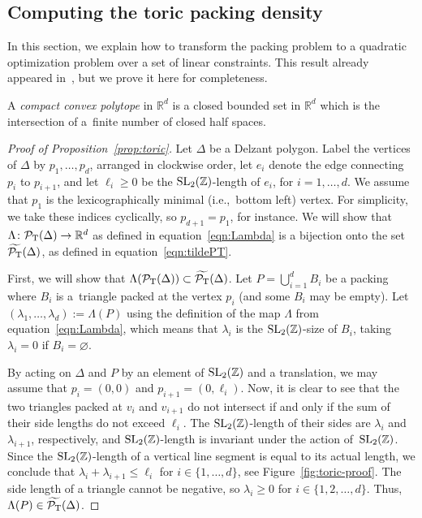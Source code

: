 \documentclass[10pt,a4paper]{amsart}
\numberwithin{equation}{section}
\def\R{{\mathbb R}}
\def\Z{{\mathbb Z}}
\newcommand{\De}{\Delta}
\newcommand{\PT}{\mathcal{P}_{\rm T}}
\newcommand{\PTtilde}{\widetilde{\PT}}
\newcommand{\SL}{{\rm SL}_2(\Z)}
\theoremstyle{definition}
\theoremstyle{plain}
\theoremstyle{plain}
\begin{document}
\subsection{Computing the toric packing density}
\label{sec:toric-computing}

In this section, we explain how to transform the packing problem to a quadratic optimization problem over a set of linear constraints.
This result already appeared in~\cite[Proposition 1.4]{PeSc2008}, but we prove it here for completeness.

A \emph{compact convex polytope} in $\R^d$ is a closed bounded set in $\R^d$ which is the intersection of a~finite number of closed half spaces.





\begin{proof}[Proof of Proposition~\ref{prop:toric}]
Let $\De$ be a Delzant polygon. Label the vertices of $\De$ by $p_1,\ldots,p_d$, arranged in clockwise order, let $e_i$ denote the edge connecting $p_i$ to $p_{i+1}$,
and let $\ell_i\geq 0$ be the $\SL$-length of $e_i$, for $i=1,\ldots, d$.
We assume that $p_1$ is the lexicographically minimal (i.e.,~bottom left) vertex.
For simplicity, we take these indices cyclically, so $p_{d+1} = p_1$, for instance.
We will show that $\Lambda\colon \PT(\De)\to\R^d$ as defined in equation~\eqref{eqn:Lambda} is a bijection onto the set $\PTtilde(\De)$, as defined in equation~\eqref{eqn:tildePT}.

First, we will show that $\Lambda(\PT(\De))\subset \PTtilde(\De)$.
Let $P = \bigcup_{i=1}^d B_i$ be a packing where $B_i$ is a~triangle packed at the vertex $p_i$ (and some $B_i$ may be empty).
Let $(\lambda_1,\ldots, \lambda_d):=\Lambda(P)$ using the definition of the map $\Lambda$ from equation~\eqref{eqn:Lambda}, which means that $\lambda_i$ is the $\SL$-size of $B_i$, taking $\lambda_i=0$ if $B_i=\varnothing$.

By acting on $\De$ and $P$ by an element of $\SL$ and a translation, we may assume that $p_i = (0,0)$ and $p_{i+1} = (0,\ell_i)$. Now, it is clear to see that the two triangles packed at $v_i$ and $v_{i+1}$ do not intersect if and only if the sum of their side lengths do not exceed $\ell_i$. The $\SL$-length of their sides are $\lambda_i$ and $\lambda_{i+1}$, respectively, and $\SL$-length is invariant under the action of~$\SL$. Since the $\SL$-length of a vertical line segment is equal to its actual length, we conclude that $\lambda_i + \lambda_{i+1} \leq \ell_i$ for $i\in\{1,\ldots,d\}$,
see Figure~\ref{fig:toric-proof}.
The side length of a triangle cannot be negative, so $\lambda_i \geq 0$ for $i \in \{1,2,\ldots,d\}$. Thus, $\Lambda(P) \in \PTtilde(\De)$.


\end{proof}
\end{document}
